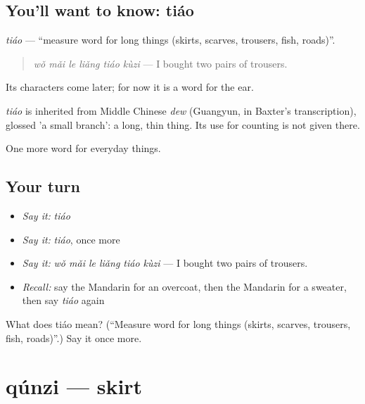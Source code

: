 \subsection*{You'll want to know: tiáo}
\emph{tiáo} — \textquotedblleft{}measure word for long things (skirts, scarves, trousers, fish, roads)\textquotedblright{}.

\begin{quote}
\emph{wǒ mǎi le liǎng tiáo kùzi} — I bought two pairs of trousers.
\end{quote}

Its characters come later; for now it is a word for the ear.

\begin{cousinweb}
\emph{tiáo} is inherited from Middle Chinese \emph{dew} (Guangyun, in Baxter's transcription), glossed 'a small branch': a long, thin thing. Its use for counting is not given there.
\end{cousinweb}

\begin{grammarlens}[title={What you've built}]
One more word for everyday things.
\end{grammarlens}

\subsection*{Your turn}
\begin{itemize}
\raggedright
  \item \emph{Say it:} \emph{tiáo}
  \item \emph{Say it:} \emph{tiáo}, once more
  \item \emph{Say it:} \emph{wǒ mǎi le liǎng tiáo kùzi} — I bought two pairs of trousers.
  \item \emph{Recall:} say the Mandarin for an overcoat, then the Mandarin for a sweater, then say \emph{tiáo} again
\end{itemize}

\begin{tcolorbox}[breakable,colback=teal!4,colframe=teal!35!black,title={Before you move on}]
What does tiáo mean? (\textquotedblleft{}Measure word for long things (skirts, scarves, trousers, fish, roads)\textquotedblright{}.) Say it once more.
\end{tcolorbox}
\section[qúnzi]{qúnzi — skirt}


